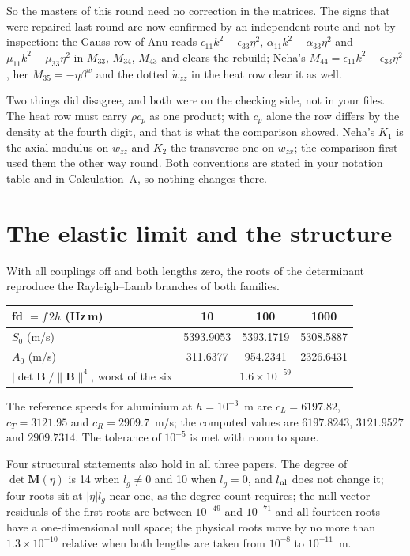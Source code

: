 \documentclass[11pt,a4paper]{article}
\begin{document}
So the masters of this round need no correction in the matrices. The signs that were repaired last
round are now confirmed by an independent route and not by inspection: the Gauss row of Anu reads
$\epsilon_{11}k^2-\epsilon_{33}\eta^2$, $\alpha_{11}k^2-\alpha_{33}\eta^2$ and
$\mu_{11}k^2-\mu_{33}\eta^2$ in $M_{33}$, $M_{34}$, $M_{43}$ and clears the rebuild; Neha's
$M_{44}=\epsilon_{11}k^2-\epsilon_{33}\eta^2$, her $M_{35}=-\eta\beta^{w}$ and the dotted
$\dot w_{zz}$ in the heat row clear it as well.

Two things did disagree, and both were on the checking side, not in your files. The heat row must
carry $\rho c_p$ as one product; with $c_p$ alone the row differs by the density at the fourth
digit, and that is what the comparison showed. Neha's $K_1$ is the axial modulus on $w_{zz}$ and
$K_2$ the transverse one on $w_{zx}$; the comparison first used them the other way round. Both
conventions are stated in your notation table and in Calculation~A, so nothing changes there.

\section*{The elastic limit and the structure}

With all couplings off and both lengths zero, the roots of the determinant reproduce the
Rayleigh--Lamb branches of both families.

\begin{center}\footnotesize
\begin{tabular}{lccc}
\toprule
fd $=f\,2h$ (Hz\,m) & 10 & 100 & 1000\\
\midrule
$S_0$ (m/s) & 5393.9053 & 5393.1719 & 5308.5887\\
$A_0$ (m/s) & 311.6377 & 954.2341 & 2326.6431\\
$|{\det\mathbf B}|/\|\mathbf B\|^4$, worst of the six & \multicolumn{3}{c}{$1.6\times10^{-59}$}\\
\bottomrule
\end{tabular}
\end{center}

The reference speeds for aluminium at $h=10^{-3}$~m are $c_L=6197.82$, $c_T=3121.95$ and
$c_R=2909.7$~m/s; the computed values are $6197.8243$, $3121.9527$ and $2909.7314$. The tolerance
of $10^{-5}$ is met with room to spare.

Four structural statements also hold in all three papers. The degree of $\det\mathbf M(\eta)$ is
14 when $l_g\ne0$ and 10 when $l_g=0$, and $l_{\rm nl}$ does not change it; four roots sit at
$|\eta|l_g$ near one, as the degree count requires; the null-vector residuals of the first roots
are between $10^{-49}$ and $10^{-71}$ and all fourteen roots have a one-dimensional null space; the
physical roots move by no more than $1.3\times10^{-10}$ relative when both lengths are taken from
$10^{-8}$ to $10^{-11}$~m.
\end{document}
